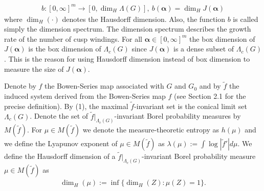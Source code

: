 \documentclass{article}
\theoremstyle{definition}
\begin{document}
\begin{align*}
    b:[0,\infty]^m\rightarrow [0,\dim_H\Lambda(G)],\ b(\boldsymbol{\alpha})=\dim_HJ(\boldsymbol{\alpha})
\end{align*}
where $\dim_H(\cdot)$ denotes the Hausdorff dimension. Also, the function $b$ is called simply the dimension spectrum. The dimension spectrum describes the growth rate of the number of cusp windings. For all $\boldsymbol{\alpha}\in [0,\infty]^m$ the box dimension of $J(\boldsymbol{\alpha})$ is the box dimension of $\Lambda_c(G)$ since $J(\boldsymbol{\alpha})$ is a dense subset of $\Lambda_c(G)$. This is the reason for using Hausdorff dimension instead of box dimension to measure the size of $J(\boldsymbol{\alpha})$.

Denote by $f$ the Bowen-Series map associated with $G$ and $G_0$ and by $\tilde f$ the induced system derived from the Bowen-Series map $f$ (see Section 2.1 for the precise definition). By (1), the maximal $\tilde f$-invariant set is the conical limit set $\Lambda_c(G)$.  Denote the set of $\tilde f|_{\Lambda_c(G)}$-invariant Borel probability  measures by $M(\tilde f)$. For $\mu\in M(\tilde f)$ we denote the measure-theoretic entropy as $h(\mu)$ and we define the Lyapunov exponent of $\mu\in M(\tilde f)$ as $\lambda(\mu):=\int\log|\tilde f'|d\mu $. We define the Hausdorff dimension of a $\tilde f|_{\Lambda_c(G)}$-invariant Borel probability  measure $\mu\in M(\tilde f)$ as
\begin{align*}
    \dim_H(\mu):=\inf\{\dim_H(Z):\mu(Z)=1\}.
\end{align*}
\end{document}

